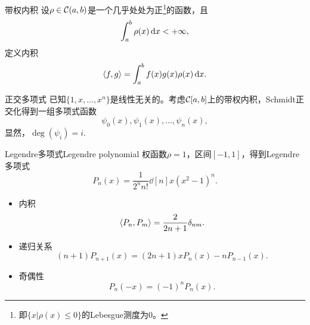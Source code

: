 \begin{definition}
    {带权内积}{}
    设$\rho\in\mathcal C(a,b)$是一个几乎处处为正\footnote{即$\{x|\rho(x)\leq 0\}$的Lebesgue测度为0。}的函数，且
    \[
        \int_a^b\rho(x)\mathop{}\!\mathrm{d} x<+\infty,
    \]
    定义内积
    \begin{equation}
        \left\langle f,g\right\rangle=\int_a^bf(x)g(x)\rho(x)\mathop{}\!\mathrm{d} x.
    \end{equation}
\end{definition}

\begin{definition}
    {正交多项式}{}
    已知$\{1,x,\ldots,x^n\}$是线性无关的。考虑$\mathcal C[a,b]$上的带权内积，Schmidt正交化得到一组多项式函数
    \[
        \psi_0(x),\psi_1(x),\ldots,\psi_n(x),
    \]
    显然，$\deg(\psi_i)=i.$
\end{definition}

\begin{example}
    {Legendre多项式}{Legendre polynomial}
    权函数$\rho=1$，区间$[-1,1]$，得到Legendre多项式
    \begin{equation}
        P_n(x)=\frac1{2^nn!}\dd[n]x(x^2-1)^n.
    \end{equation}
    \begin{itemize}
        \item 内积 
        \begin{equation}
            \left\langle P_n,P_m\right\rangle=\frac2{2n+1}\delta_{nm}.
        \end{equation}
        \item 递归关系
        \begin{equation}
            (n+1)P_{n+1}(x)=(2n+1)xP_n(x)-nP_{n-1}(x).
        \end{equation}
        \item 奇偶性
        \begin{equation}
            P_n(-x)=(-1)^nP_n(x).
        \end{equation}
    \end{itemize}
\end{example}

